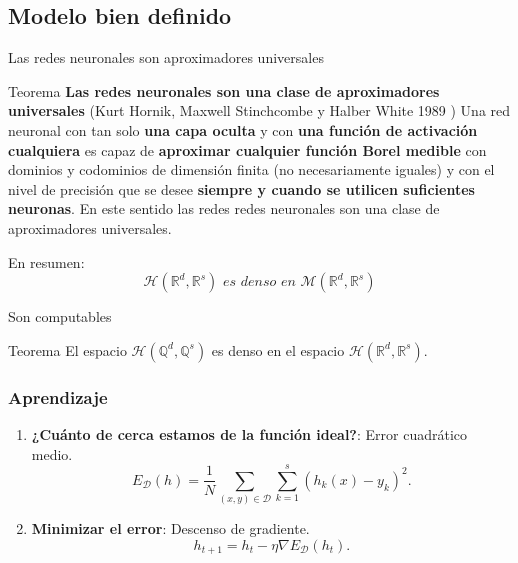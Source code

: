 \documentclass{beamer}
\newcommand{\R}{\mathbb{R}}
\newcommand{\Q}{\mathbb{Q}}
\newcommand{\rrnnmc}{ \mathcal{H}(\R^d,\R^s)}
\begin{document}
\subsection{Modelo bien definido}
\begin{frame}{Las redes neuronales son aproximadores universales}
    \begin{block}{Teorema  \textbf{Las redes neuronales son una clase de aproximadores universales}}
        (Kurt Hornik, Maxwell Stinchcombe y Halber White 1989 \cite{HORNIK1989359})
        Una red neuronal con tan solo \textbf{una capa oculta} y con \textbf{una función de activación cualquiera} es capaz de \textbf{aproximar cualquier 
        función Borel medible}  con dominios y codominios de dimensión finita (no necesariamente iguales) y con el nivel de precisión que se desee \textbf{siempre y cuando 
        se utilicen suficientes neuronas}. En este sentido las redes redes neuronales son una clase de aproximadores universales.
    \end{block}
    En resumen: 
    \begin{equation*}
        \mathcal{H}(\R^d,\R^s)  \textit{ es denso en } \mathcal{M}(\R^d,\R^s) 
    \end{equation*}
\end{frame}
\begin{frame}{Son computables}
    \begin{exampleblock}{Teorema}
        El espacio $\mathcal{H}(\Q^d, \Q^s)$ es denso en el espacio $\rrnnmc$. 
    \end{exampleblock}
\end{frame}


\begin{frame}
\frametitle{Aprendizaje} 
\begin{enumerate}
    \item \textbf{¿Cuánto de cerca estamos de la función ideal?}: Error cuadrático medio. 
    \begin{equation*}
        E_{\mathcal{D}}(h) = \frac{1}{N} \sum_{(x,y) \in \mathcal{D}} \sum_{k=1}^s(h_k(x)- y_k)^2. 
    \end{equation*}
    \pause 
   \item  \textbf{Minimizar el error}: Descenso de gradiente. 
    \begin{equation*}
        h_{t+1}  = h_t - \eta \nabla E_{\mathcal{D}}(h_t).
    \end{equation*}  
\end{enumerate}
\end{frame}
\end{document}
